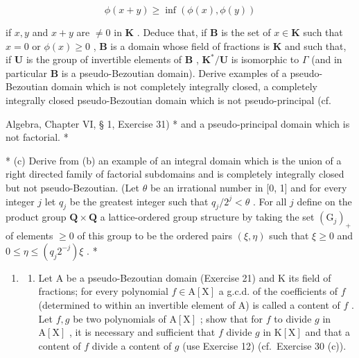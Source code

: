 \[
\phi (x + y) \geqslant \inf (\phi (x), \phi (y))
\]

if \(x, y\) and \(x + y\) are \(\neq 0\) in \(\mathbf{K}\) . Deduce that, if \(\mathbf{B}\) is the set of \(x \in \mathbf{K}\) such that \(x = 0\) or \(\phi(x) \geqslant 0\) , \(\mathbf{B}\) is a domain whose field of fractions is \(\mathbf{K}\) and such that, if \(\mathbf{U}\) is the group of invertible elements of \(\mathbf{B}\) , \(\mathbf{K}^*/\mathbf{U}\) is isomorphic to \(\Gamma\) (and in particular \(\mathbf{B}\) is a pseudo-Bezoutian domain). Derive examples of a pseudo-Bezoutian domain which is not completely integrally closed, a completely integrally closed pseudo-Bezoutian domain which is not pseudo-principal (cf.

Algebra, Chapter VI, § 1, Exercise 31) * and a pseudo-principal domain which is not factorial. *

* (c) Derive from (b) an example of an integral domain which is the union of a right directed family of factorial subdomains and is completely integrally closed but not pseudo-Bezoutian. (Let \(\theta\) be an irrational number in {[}0, 1{]} and for every integer \(j\) let \(q_j\) be the greatest integer such that \(q_j / 2^j < \theta\) . For all \(j\) define on the product group \(\mathbf{Q} \times \mathbf{Q}\) a lattice-ordered group structure by taking the set \((\mathrm{G}_j)_+\) of elements \(\geqslant 0\) of this group to be the ordered pairs \((\xi, \eta)\) such that \(\xi \geqslant 0\) and \(0 \leqslant \eta \leqslant (q_j 2^{-j}) \xi\) . *

\begin{enumerate}
\def\labelenumi{\arabic{enumi}.}
\setcounter{enumi}{22}
\tightlist
\item
  \begin{enumerate}
  \def\labelenumii{(\alph{enumii})}
  \tightlist
  \item
    Let A be a pseudo-Bezoutian domain (Exercise 21) and K its field of fractions; for every polynomial \(f \in \mathrm{A}[\mathrm{X}]\) a g.c.d. of the coefficients of \(f\) (determined to within an invertible element of A) is called a content of \(f\) . Let \(f, g\) be two polynomials of \(\mathrm{A}[\mathrm{X}]\) ; show that for \(f\) to divide \(g\) in \(\mathrm{A}[\mathrm{X}]\) , it is necessary and sufficient that \(f\) divide \(g\) in \(\mathrm{K}[\mathrm{X}]\) and that a content of \(f\) divide a content of \(g\) (use Exercise 12) (cf.~Exercise 30 (c)).
  \end{enumerate}
\end{enumerate}

